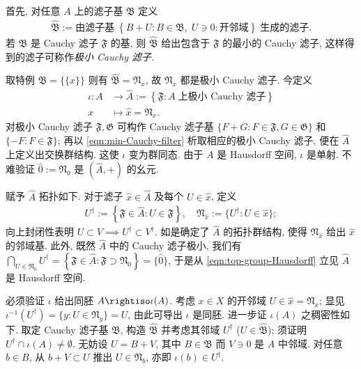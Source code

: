 \begin{asparaenum}
	\item 首先, 对任意 $A$ 上的滤子基 $\mathfrak{B}$ 定义
	\begin{gather}\label{eqn:min-Cauchy-filter}
		\hat{\mathfrak{B}} := \text{由滤子基}\; \left\{ B+U: B \in \mathfrak{B},\; U \ni 0: \text{开邻域} \right\} \;\text{生成的滤子}.
	\end{gather}
	若 $\mathfrak{B}$ 是 Cauchy 滤子 $\mathfrak{F}$ 的基, 则 $\hat{\mathfrak{B}}$ 给出包含于 $\mathfrak{F}$ 的最小的 Cauchy 滤子, 这样得到的滤子可称作\emph{极小 Cauchy 滤子}.

	\item 取特例 $\mathfrak{B} = \{\{x\}\}$ 则有 $\hat{\mathfrak{B}} = \mathfrak{N}_x$, 故 $\mathfrak{N}_x$ 都是极小 Cauchy 滤子. 今定义
	\begin{align*}
		\iota: A & \longrightarrow \hat{A} := \left\{ \mathfrak{F}: A\; \text{上极小 Cauchy 滤子} \right\} \\
		x & \longmapsto \hat{x} = \mathfrak{N}_x.
	\end{align*}
	对极小 Cauchy 滤子 $\mathfrak{F}, \mathfrak{G}$ 可构作 Cauchy 滤子基 $\{ F+G : F \in \mathfrak{F}, G \in \mathfrak{G} \}$ 和 $\{ -F: F \in \mathfrak{F} \}$; 再以 \eqref{eqn:min-Cauchy-filter} 析取相应的极小 Cauchy 滤子, 便在 $\hat{A}$ 上定义出交换群结构. 这使 $\iota$ 变为群同态. 由于 $A$ 是 Hausdorff 空间, $\iota$ 是单射. 不难验证 $\hat{0} := \mathfrak{N}_0$ 是 $(\hat{A}, +)$ 的幺元.

	\item 赋予 $\hat{A}$ 拓扑如下. 对于滤子 $\hat{x} \in \hat{A}$ 及每个 $U \in \hat{x}$, 定义
	\begin{gather}\label{eqn:filter-dagger}
		U^\dagger := \left\{ \mathfrak{F} \in \hat{A} : U \in \mathfrak{F} \right\}, \quad \mathfrak{N}_{\hat{x}} := \{ U^\dagger: U \in \hat{x} \};
	\end{gather}
	向上封闭性表明 $U \subset V \implies U^\dagger \subset V^\dagger$. 如是确定了 $\hat{A}$ 的拓扑群结构, 使得 $\mathfrak{N}_{\hat{x}}$ 给出 $\hat{x}$ 的邻域基. 此外, 既然 $\hat{A}$ 中的 Cauchy 滤子极小, 我们有 $\bigcap_{U \in \mathfrak{N}_0} U^\dagger = \left\{ \mathfrak{F} \in \hat{A}: \mathfrak{F} \supset \mathfrak{N}_0 \right\} = \{\hat{0}\}$, 于是从 \eqref{eqn:top-group-Hausdorff} 立见 $\hat{A}$ 是 Hausdorff 空间.
	
	\item 必须验证 $\iota$ 给出同胚 $A \rightiso \iota(A)$. 考虑 $x \in X$ 的开邻域 $U \in \hat{x} = \mathfrak{N}_x$; 显见 $\iota^{-1}(U^\dagger) = \{y: U \in \mathfrak{N}_y \} = U$, 由此可导出 $\iota$ 是同胚. 进一步证 $\iota(A)$ 之稠密性如下. 取定 Cauchy 滤子基 $\mathfrak{B}$, 构造 $\hat{\mathfrak{B}}$ 并考虑其邻域 $U^\dagger$ ($U \in \hat{\mathfrak{B}}$); 须证明 $U^\dagger \cap \iota(A) \neq \emptyset$. 无妨设 $U = B+V$, 其中 $B \in \mathfrak{B}$ 而 $V \ni 0$ 是 $A$ 中邻域. 对任意 $b \in B$, 从 $b+V \subset U$ 推出 $U \in \mathfrak{N}_b$, 亦即 $\iota(b) \in U^\dagger$.


\end{asparaenum}
